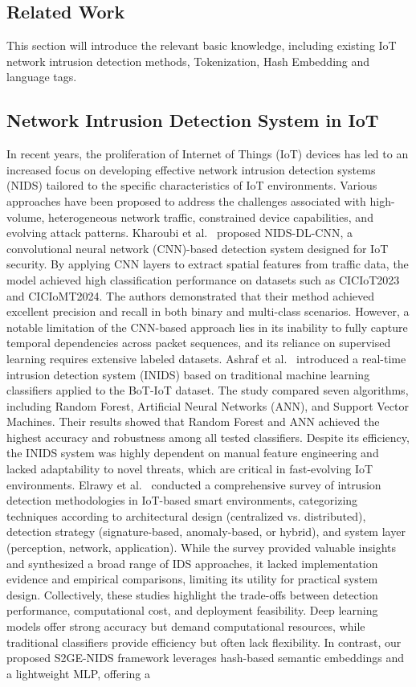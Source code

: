 \begin{ZhChapter}
    \chapter{Related Work}
    This section will introduce the relevant basic knowledge, including existing IoT network intrusion detection methods, Tokenization, Hash Embedding and language tags.

    \section{Network Intrusion Detection System in IoT}
    In recent years, the proliferation of Internet of Things (IoT) devices has led to an increased focus on developing effective network intrusion detection systems (NIDS) tailored to the specific characteristics of IoT environments. Various approaches have been proposed to address the challenges associated with high-volume, heterogeneous network traffic, constrained device capabilities, and evolving attack patterns. Kharoubi et al.~\cite{kharoubi2025nidscnn} proposed NIDS-DL-CNN, a convolutional neural network (CNN)-based detection system designed for IoT security. By applying CNN layers to extract spatial features from traffic data, the model achieved high classification performance on datasets such as CICIoT2023 and CICIoMT2024. The authors demonstrated that their method achieved excellent precision and recall in both binary and multi-class scenarios. However, a notable limitation of the CNN-based approach lies in its inability to fully capture temporal dependencies across packet sequences, and its reliance on supervised learning requires extensive labeled datasets. Ashraf et al.~\cite{ashraf2025inids} introduced a real-time intrusion detection system (INIDS) based on traditional machine learning classifiers applied to the BoT-IoT dataset. The study compared seven algorithms, including Random Forest, Artificial Neural Networks (ANN), and Support Vector Machines. Their results showed that Random Forest and ANN achieved the highest accuracy and robustness among all tested classifiers. Despite its efficiency, the INIDS system was highly dependent on manual feature engineering and lacked adaptability to novel threats, which are critical in fast-evolving IoT environments. Elrawy et al.~\cite{elrawy2018survey} conducted a comprehensive survey of intrusion detection methodologies in IoT-based smart environments, categorizing techniques according to architectural design (centralized vs. distributed), detection strategy (signature-based, anomaly-based, or hybrid), and system layer (perception, network, application). While the survey provided valuable insights and synthesized a broad range of IDS approaches, it lacked implementation evidence and empirical comparisons, limiting its utility for practical system design. Collectively, these studies highlight the trade-offs between detection performance, computational cost, and deployment feasibility. Deep learning models offer strong accuracy but demand computational resources, while traditional classifiers provide efficiency but often lack flexibility. In contrast, our proposed S2GE-NIDS framework leverages hash-based semantic embeddings and a lightweight MLP, offering a 
\end{ZhChapter}
